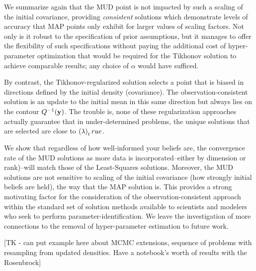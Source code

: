 We summarize again that the MUD point is not impacted by such a scaling of the initial covariance, providing \emph{consistent} solutions which demonstrate levels of accuracy that MAP points only exhibit for larger values of scaling factors.
Not only is it robust to the specification of prior assumptions, but it manages to offer the flexibility of such specifications without paying the additional cost of hyper-parameter optimization that would be required for the Tikhonov solution to achieve comparable results; any choice of $\alpha$ would have sufficed.

By contrast, the Tikhonov-regularized solution selects a point that is biased in directions defined by the initial density (covariance).
The observation-consistent solution is an update to the initial mean in this same direction but always lies on the contour $Q^{-1}(\mathbf{y})$.
The trouble is, none of these regularization approaches actually guarantee that in under-determined problems, the unique solutions that are selected are close to $\left ( \lambda \right )_true$.

We show that regardless of how well-informed your beliefs are, the convergence rate of the MUD solutions as more data is incorporated\---either by dimension or rank)\---will match those of the Least-Squares solutions.
Moreover, the MUD solutions are not sensitive to scaling of the initial covariance (how strongly initial beliefs are held), the way that the MAP solution is.
This provides a strong motivating factor for the consideration of the observation-consistent approach within the standard set of solution methods available to scientists and modelers who seek to perform parameter-identification.
We leave the investigation of more connections to the removal of hyper-parameter estimation to future work.

[TK - can put example here about MCMC extensions, sequence of problems with resampling from updated densities. Have a notebook's worth of results with the Rosenbrock]

